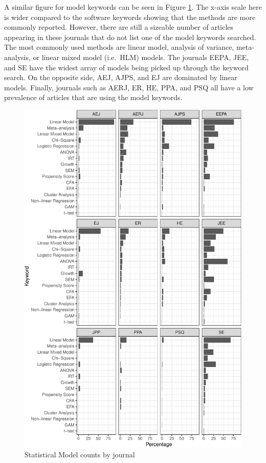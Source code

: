 \documentclass[english,,man]{apa6}
\theoremstyle{definition}
\theoremstyle{definition}
\theoremstyle{definition}
\theoremstyle{remark}
\begin{document}
A similar figure for model keywords can be seen in Figure
\ref{fig:model-journal}. The x-axis scale here is wider compared to the
software keywords showing that the methods are more commonly reported.
However, there are still a sizeable number of articles appearing in
these journals that do not list one of the model keywords searched. The
most commonly used methods are linear model, analysis of variance,
meta-analysis, or linear mixed model (i.e.~HLM) models. The journals
EEPA, JEE, and SE have the widest array of models being picked up
through the keyword search. On the opposite side, AEJ, AJPS, and EJ are
dominated by linear models. Finally, journals such as AERJ, ER, HE, PPA,
and PSQ all have a low prevalence of articles that are using the model
keywords.

\begin{figure}
\centering
\includegraphics{software_files/figure-latex/model-journal-1.pdf}
\caption{\label{fig:model-journal}Statistical Model counts by journal}
\end{figure}
\end{document}
